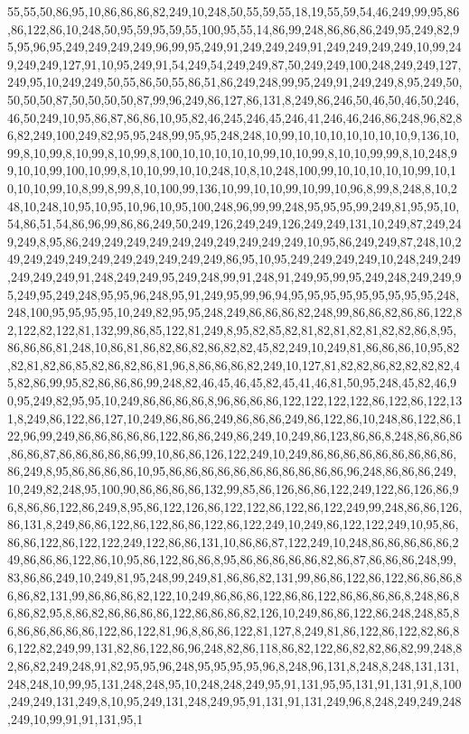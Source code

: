 55,55,50,86,95,10,86,86,86,82,249,10,248,50,55,59,55,18,19,55,59,54,46,249,99,95,86,86,122,86,10,248,50,95,59,95,59,55,100,95,55,14,86,99,248,86,86,86,249,95,249,82,95,95,96,95,249,249,249,249,96,99,95,249,91,249,249,249,91,249,249,249,249,10,99,249,249,249,127,91,10,95,249,91,54,249,54,249,249,87,50,249,249,100,248,249,249,127,249,95,10,249,249,50,55,86,50,55,86,51,86,249,248,99,95,249,91,249,249,8,95,249,50,50,50,50,87,50,50,50,50,87,99,96,249,86,127,86,131,8,249,86,246,50,46,50,46,50,246,46,50,249,10,95,86,87,86,86,10,95,82,46,245,246,45,246,41,246,46,246,86,248,96,82,86,82,249,100,249,82,95,95,248,99,95,95,248,248,10,99,10,10,10,10,10,10,10,9,136,10,99,8,10,99,8,10,99,8,10,99,8,100,10,10,10,10,10,99,10,10,99,8,10,10,99,99,8,10,248,99,10,10,99,100,10,99,8,10,10,99,10,10,248,10,8,10,248,100,99,10,10,10,10,10,99,10,10,10,10,99,10,8,99,8,99,8,10,100,99,136,10,99,10,10,99,10,99,10,96,8,99,8,248,8,10,248,10,248,10,95,10,95,10,96,10,95,100,248,96,99,99,248,95,95,95,99,249,81,95,95,10,54,86,51,54,86,96,99,86,86,249,50,249,126,249,249,126,249,249,131,10,249,87,249,249,249,8,95,86,249,249,249,249,249,249,249,249,249,249,10,95,86,249,249,87,248,10,249,249,249,249,249,249,249,249,249,249,86,95,10,95,249,249,249,249,10,248,249,249,249,249,249,91,248,249,249,95,249,248,99,91,248,91,249,95,99,95,249,248,249,249,95,249,95,249,248,95,95,96,248,95,91,249,95,99,96,94,95,95,95,95,95,95,95,95,95,248,248,100,95,95,95,95,10,249,82,95,95,248,249,86,86,86,82,248,99,86,86,82,86,86,122,82,122,82,122,81,132,99,86,85,122,81,249,8,95,82,85,82,81,82,81,82,81,82,82,86,8,95,86,86,86,81,248,10,86,81,86,82,86,82,86,82,82,45,82,249,10,249,81,86,86,86,10,95,82,82,81,82,86,85,82,86,82,86,81,96,8,86,86,86,82,249,10,127,81,82,82,86,82,82,82,82,45,82,86,99,95,82,86,86,86,99,248,82,46,45,46,45,82,45,41,46,81,50,95,248,45,82,46,90,95,249,82,95,95,10,249,86,86,86,86,8,96,86,86,86,122,122,122,122,86,122,86,122,131,8,249,86,122,86,127,10,249,86,86,86,249,86,86,86,249,86,122,86,10,248,86,122,86,122,96,99,249,86,86,86,86,86,122,86,86,249,86,249,10,249,86,123,86,86,8,248,86,86,86,86,86,87,86,86,86,86,86,99,10,86,86,126,122,249,10,249,86,86,86,86,86,86,86,86,86,86,249,8,95,86,86,86,86,10,95,86,86,86,86,86,86,86,86,86,86,86,96,248,86,86,86,249,10,249,82,248,95,100,90,86,86,86,86,132,99,85,86,126,86,86,122,249,122,86,126,86,96,8,86,86,122,86,249,8,95,86,122,126,86,122,122,86,122,86,122,249,99,248,86,86,126,86,131,8,249,86,86,122,86,122,86,86,122,86,122,249,10,249,86,122,122,249,10,95,86,86,86,122,86,122,122,249,122,86,86,131,10,86,86,87,122,249,10,248,86,86,86,86,86,249,86,86,86,122,86,10,95,86,122,86,86,8,95,86,86,86,86,86,82,86,87,86,86,86,248,99,83,86,86,249,10,249,81,95,248,99,249,81,86,86,82,131,99,86,86,122,86,122,86,86,86,86,86,82,131,99,86,86,86,82,122,10,249,86,86,86,122,86,86,122,86,86,86,86,8,248,86,86,86,82,95,8,86,82,86,86,86,86,122,86,86,86,82,126,10,249,86,86,122,86,248,248,85,86,86,86,86,86,86,122,86,122,81,96,8,86,86,122,81,127,8,249,81,86,122,86,122,82,86,86,122,82,249,99,131,82,86,122,86,96,248,82,86,118,86,82,122,86,82,82,86,82,99,248,82,86,82,249,248,91,82,95,95,96,248,95,95,95,95,96,8,248,96,131,8,248,8,248,131,131,248,248,10,99,95,131,248,248,95,10,248,248,249,95,91,131,95,95,131,91,131,91,8,100,249,249,131,249,8,10,95,249,131,248,249,95,91,131,91,131,249,96,8,248,249,249,248,249,10,99,91,91,131,95,1